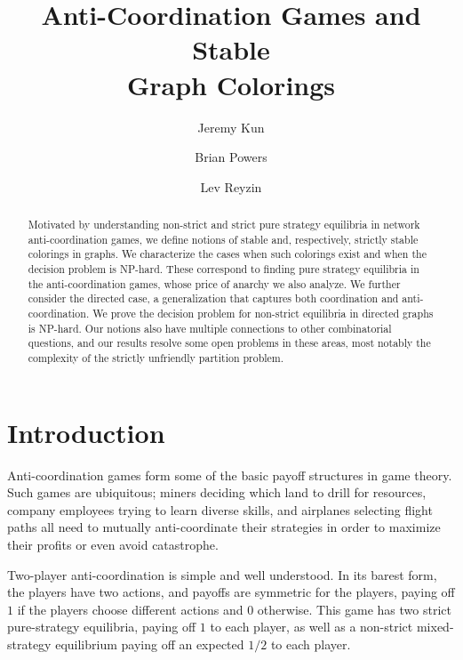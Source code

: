 \documentclass{llncs}
\title{Anti-Coordination Games and Stable \\Graph Colorings}
\begin{document}
\author{Jeremy Kun \and Brian Powers \and Lev Reyzin}


\maketitle


\begin{abstract}
Motivated by understanding non-strict and strict pure strategy equilibria in
network anti-coordination games, we define notions of stable and, respectively,
strictly stable colorings in graphs.  We characterize the cases when such
colorings exist and when the decision problem is NP-hard. These correspond to
finding pure strategy equilibria in the anti-coordination games, whose price of
anarchy we also analyze.  We further consider the directed case, a
generalization that captures both coordination and anti-coordination. We prove
the decision problem for non-strict equilibria in directed graphs is NP-hard.
Our notions also have multiple connections to other combinatorial questions, and
our results resolve some open problems in these areas, most notably the
complexity of the strictly unfriendly partition problem.
\end{abstract}

\section{Introduction}

Anti-coordination games form some of the basic payoff structures in game theory.
Such games are ubiquitous; miners deciding which land to drill for resources,
company employees trying to learn diverse skills, and airplanes selecting flight
paths all need to mutually anti-coordinate their strategies in order to maximize
their profits or even avoid catastrophe.

Two-player anti-coordination is simple and well understood.  In its barest form,
the players have two actions, and payoffs are symmetric for the players, paying
off $1$ if the players choose different actions and $0$ otherwise.  This game
has two strict pure-strategy equilibria, paying off $1$ to each player, as well
as a non-strict mixed-strategy equilibrium paying off an expected $1/2$ to each
player.
\end{document}
